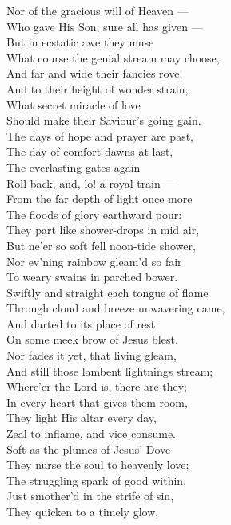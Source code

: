  Nor of the gracious will of Heaven — \\
 Who gave His Son, sure all has given — \\
 But in ecstatic awe they muse \\
 What course the genial stream may choose, \\
 And far and wide their fancies rove, \\
 And to their height of wonder strain, \\
 What secret miracle of love \\
 Should make their Saviour’s going gain. \\
  The days of hope and prayer are past, \\
 The day of comfort dawns at last, \\
 The everlasting gates again \\
 Roll back, and, lo! a royal train — \\
 From the far depth of light once more \\
 The floods of glory earthward pour: \\
 They part like shower-drops in mid air, \\
 But ne’er so soft fell noon-tide shower, \\
 Nor ev’ning rainbow gleam’d so fair \\
 To weary swains in parched bower. \\
  Swiftly and straight each tongue of flame \\
 Through cloud and breeze unwavering came, \\
 And darted to its place of rest \\
 On some meek brow of Jesus blest. \\
 Nor fades it yet, that living gleam, \\
 And still those lambent lightnings stream; \\
 Where’er the Lord is, there are they; \\
 In every heart that gives them room, \\
 They light His altar every day, \\
 Zeal to inflame, and vice consume. \\
  Soft as the plumes of Jesus’ Dove \\
 They nurse the soul to heavenly love; \\
 The struggling spark of good within, \\
 Just smother’d in the strife of sin, \\
 They quicken to a timely glow, \\
